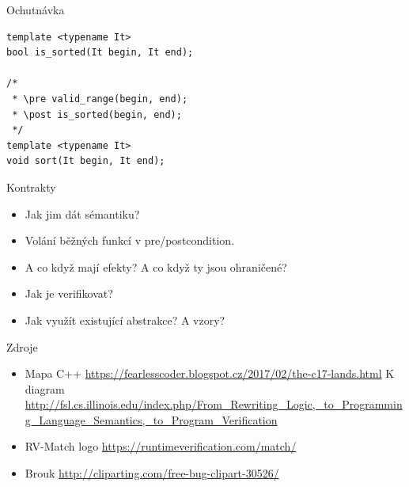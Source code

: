 \documentclass[11pt]{beamer}
\begin{document}
%
\begin{frame}[fragile=singleslide]{Ochutnávka}
\begin{lstlisting}
template <typename It>
bool is_sorted(It begin, It end);

/*
 * \pre valid_range(begin, end);
 * \post is_sorted(begin, end);
 */
template <typename It>
void sort(It begin, It end);
\end{lstlisting}
\end{frame}


\begin{frame}{Kontrakty}
\begin{itemize}
\pause \item Jak jim dát sémantiku?
\pause \item Volání běžných funkcí v pre/postcondition.
\pause \item A co když mají efekty? A co když ty jsou ohraničené?
\pause \item Jak je verifikovat?
\pause \item Jak využít existující abstrakce? A vzory?
\end{itemize}
\end{frame}


\begin{frame}{Zdroje}
\begin{itemize}
\item Mapa C++ \url{https://fearlesscoder.blogspot.cz/2017/02/the-c17-lands.html}
K diagram \url{http://fsl.cs.illinois.edu/index.php/From\_Rewriting\_Logic,\_to\_Programming\_Language\_Semantics,\_to\_Program\_Verification} \\
\item RV-Match logo \url{https://runtimeverification.com/match/}
\item Brouk \url{http://cliparting.com/free-bug-clipart-30526/}
\end{itemize}
\end{frame}
\end{document}
